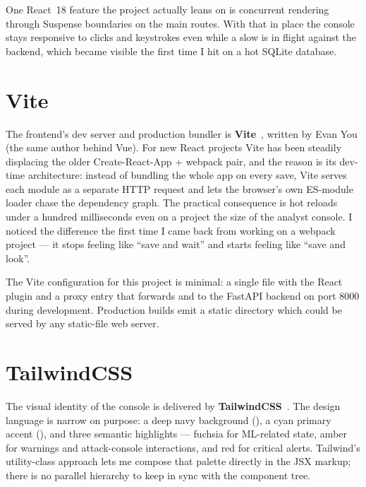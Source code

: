 One React~18 feature the project actually leans on is concurrent
rendering through Suspense boundaries on the main routes. With
that in place the console stays responsive to clicks and
keystrokes even while a slow  is in flight against
the backend, which became visible the first time I hit
 on a hot SQLite database.

\section{Vite}
\label{sec:tech-vite}

The frontend's dev server and production bundler is
\textbf{Vite}~\cite{vite}, written by Evan You (the same author
behind Vue). For new React projects Vite has been steadily
displacing the older Create-React-App + webpack pair, and the
reason is its dev-time architecture: instead of bundling the
whole app on every save, Vite serves each module as a separate
HTTP request and lets the browser's own ES-module loader chase
the dependency graph. The practical consequence is hot reloads
under a hundred milliseconds even on a project the size of the
analyst console. I noticed the difference the first time I came
back from working on a webpack project --- it stops feeling like
``save and wait'' and starts feeling like ``save and look''.

The Vite configuration for this project is minimal: a single
 file with the React plugin and a proxy entry
that forwards  and  to the FastAPI backend on
port 8000 during development. Production builds emit a static
 directory which could be served by any static-file web
server.

\section{TailwindCSS}
\label{sec:tech-tailwind}

The visual identity of the console is delivered by
\textbf{TailwindCSS}~\cite{tailwind}. The design language is
narrow on purpose: a deep navy background (), a
cyan primary accent (), and three semantic
highlights --- fuchsia for ML-related state, amber for warnings
and attack-console interactions, and red for critical alerts.
Tailwind's utility-class approach lets me compose that palette
directly in the JSX markup; there is no parallel
 hierarchy to keep in sync with the
component tree.


